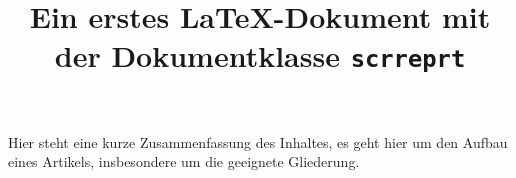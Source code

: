 



\title{Ein erstes \LaTeX-Dokument mit der Dokumentklasse \texttt{scrreprt}}


\frontmatter                    %



    Hier steht eine kurze Zusammenfassung des Inhaltes, es geht hier um den
    Aufbau eines Artikels, insbesondere um die geeignete Gliederung.

\tableofcontents

